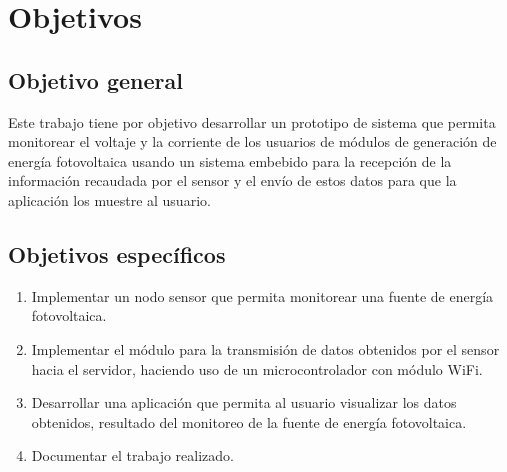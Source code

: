 
\section{Objetivos}

\subsection{Objetivo general}
Este trabajo tiene por objetivo desarrollar un prototipo de sistema que permita monitorear el voltaje y la corriente de los usuarios de módulos de generación de energía fotovoltaica usando un sistema embebido para la recepción de la información recaudada por el sensor y el envío de estos datos para que la aplicación los muestre al usuario.

\subsection{Objetivos específicos}
\begin{enumerate}[label=\arabic*.]
    \item Implementar un nodo sensor que permita monitorear una fuente de energía fotovoltaica.
    \item Implementar el módulo para la transmisión de datos obtenidos por el sensor hacia el servidor, haciendo uso de un microcontrolador con módulo WiFi. 
    \item Desarrollar una aplicación que permita al usuario visualizar los datos obtenidos, resultado del monitoreo de la fuente de energía fotovoltaica.
    \item Documentar el trabajo realizado.
\end{enumerate}
